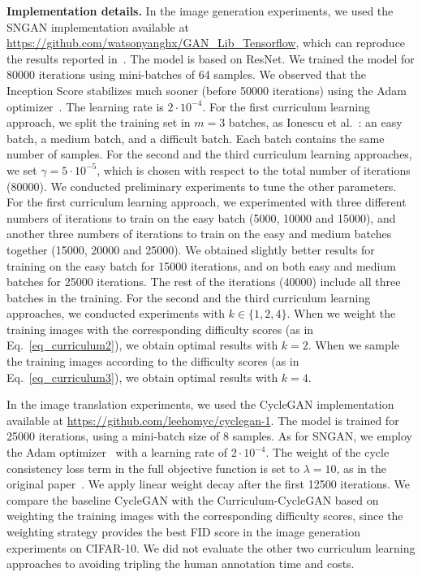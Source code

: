 \documentclass[10pt,twocolumn,letterpaper]{article}
\begin{document}
\noindent 
{\bf Implementation details.}
In the image generation experiments, we used the SNGAN implementation available at \url{https://github.com/watsonyanghx/GAN\_Lib\_Tensorflow}, which can reproduce the results reported in~\cite{Miyato-ICLR-2018}. The model is based on ResNet. We trained the model for 80000 iterations using mini-batches of 64 samples. We observed that the Inception Score stabilizes much sooner (before 50000 iterations) using the Adam optimizer~\cite{Kingma-ICLR-2015}. The learning rate is $2 \cdot 10^{-4}$. For the first curriculum learning approach, we split the training set in $m=3$ batches, as Ionescu et al.~\cite{Ionescu-CVPR-2016}: an easy batch, a medium batch, and a difficult batch. Each batch contains the same number of samples. For the second and the third curriculum learning approaches, we set $\gamma = 5 \cdot 10^{-5}$, which is chosen with respect to the total number of iterations (80000). We conducted preliminary experiments to tune the other parameters. For the first curriculum learning approach, we experimented with three different numbers of iterations to train on the easy batch (5000, 10000 and 15000), and another three numbers of iterations to train on the easy and medium batches together (15000, 20000 and 25000). We obtained slightly better results for training on the easy batch for 15000 iterations, and on both easy and medium batches for 25000 iterations. The rest of the iterations (40000) include all three batches in the training. For the second and the third curriculum learning approaches, we conducted experiments with $k \in \{1, 2, 4\}$. When we weight the training images with the corresponding difficulty scores (as in Eq.~\eqref{eq_curriculum2}), we obtain optimal results with $k=2$. When we sample the training images according to the difficulty scores (as in Eq.~\eqref{eq_curriculum3}), we obtain optimal results with $k=4$.

In the image translation experiments, we used the CycleGAN implementation available at \url{https://github.com/leehomyc/cyclegan-1}. The model is trained for 25000 iterations, using a mini-batch size of $8$ samples. As for SNGAN, we employ the Adam optimizer~\cite{Kingma-ICLR-2015} with a learning rate of $2 \cdot 10^{-4}$. The weight of the cycle consistency loss term in the full objective function is set to $\lambda = 10$, as in the original paper~\cite{Zhu-ICCV-2017}. We apply linear weight decay after the first 12500 iterations. We compare the baseline CycleGAN with the Curriculum-CycleGAN based on weighting the training images with the corresponding difficulty scores, since the weighting strategy provides the best FID score in the image generation experiments on CIFAR-10. We did not evaluate the other two curriculum learning approaches to avoiding tripling the human annotation time and costs.
\end{document}

